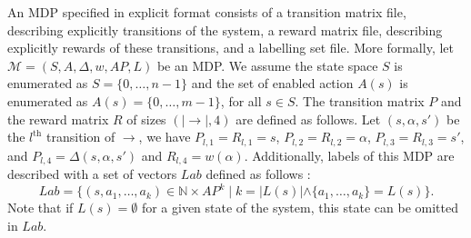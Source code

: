 An MDP specified in explicit format
consists of a transition matrix file, describing explicitly transitions of the system, a reward matrix file, describing explicitly
rewards of these transitions, and a labelling set file. More formally, let $\mathcal{M} = (S, A, \Delta, w, AP, L)$ be an MDP.
We assume the state space $S$ is enumerated as $S = \{0, \dots, n-1\}$ and the set of enabled action $A(s)$ is enumerated as $A(s) = \{0, \dots, m-1\}$, for all $s \in S$.
The transition matrix $P$ and the reward matrix $R$ of sizes $(|\rightarrow|, 4)$ are defined as follows.
Let $(s, \alpha, s')$ be the $l^\text{th}$
transition of $\rightarrow$, we have $P_{l, 1} =
R_{l, 1} = s$, $P_{l, 2} = R_{l,2} = \alpha$,
$P_{l,3} = R_{l,3} = s'$, and $P_{l, 4} = \Delta(s, \alpha, s')$ and $R_{l, 4} = w(\alpha)$.
Additionally, labels of this MDP are described with a set of vectors $Lab$ defined as follows : \[Lab = \{(s, a_1, \dots, a_k) \in \mathbb{N} \times AP^k \; | \; k = |L(s)| \wedge \{a_1, \dots, a_k\} = L(s)\}.\]
Note that if $L(s)= \emptyset$ for a given state of the system, this state can be omitted in $Lab$.

